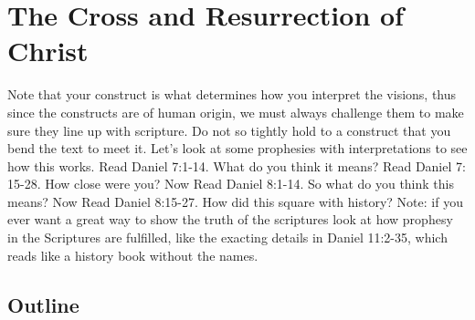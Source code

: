 \chapter{The Cross and Resurrection of Christ}


Note that your construct is what determines how you interpret the visions, thus since the constructs are of human origin, we must always challenge them to make sure they line up with scripture.  Do not so tightly hold to a construct that you bend the text to meet it.  Let's look at some prophesies with interpretations to see how this works.  Read Daniel 7:1-14.  What do you think it means?  Read Daniel 7: 15-28.  How close were you? Now Read Daniel 8:1-14.  So what do you think this means?  Now Read Daniel 8:15-27.  How did this square with history?  Note: if you ever want a great way to show the truth of the scriptures look at how prophesy in the Scriptures are fulfilled, like the exacting details in Daniel 11:2-35, which reads like a history book without the names.


\section{Outline}

